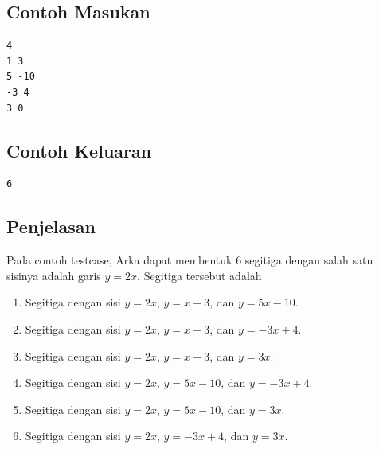 \documentclass{article}
\begin{document}
\begin{multicols}{2}
\subsection*{Contoh Masukan}
\begin{lstlisting}
4
1 3
5 -10
-3 4
3 0
\end{lstlisting}
\columnbreak
\subsection*{Contoh Keluaran}
\begin{lstlisting}
6
\end{lstlisting}
\vfill
\null
\end{multicols}

\subsection*{Penjelasan}
Pada contoh testcase, Arka dapat membentuk 6 segitiga dengan salah satu sisinya adalah garis $y = 2x$. Segitiga tersebut adalah

\begin{enumerate}
\item Segitiga dengan sisi $y = 2x$, $y = x + 3$, dan $y = 5x - 10$.
\item Segitiga dengan sisi $y = 2x$, $y = x + 3$, dan $y = -3x + 4$.
\item Segitiga dengan sisi $y = 2x$, $y = x + 3$, dan $y = 3x$.
\item Segitiga dengan sisi $y = 2x$, $y = 5x - 10$, dan $y = -3x + 4$.
\item Segitiga dengan sisi $y = 2x$, $y = 5x - 10$, dan $y = 3x$.
\item Segitiga dengan sisi $y = 2x$, $y = -3x + 4$, dan $y = 3x$.
\end{enumerate}
\end{document}
